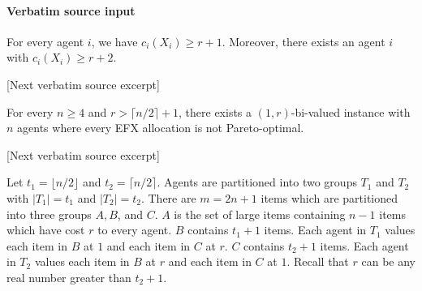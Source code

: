 \documentclass[10pt]{article}
\begin{document}
\paragraph{Verbatim source input}
\begin{ReviewVerbatim}
\begin{proposition}\label{prop:r+1r+2}
    For every agent $i$, we have $c_i(X_i)\geq r+1$. Moreover, there exists an agent $i$ with $c_i(X_i)\geq r+2$.
\end{proposition}

[Next verbatim source excerpt]

\begin{theorem}\label{thm:EFXPO}
    For every $n\geq 4$ and $r>\lceil n/2\rceil+1$, there exists a $(1,r)$-bi-valued instance with $n$ agents where every EFX allocation is not Pareto-optimal.
\end{theorem}

[Next verbatim source excerpt]

Let $t_1=\lfloor n/2\rfloor$ and $t_2=\lceil n/2\rceil$.
Agents are partitioned into two groups $T_1$ and $T_2$ with $|T_1|=t_1$ and $|T_2|=t_2$.
There are $m=2n+1$ items which are partitioned into three groups $A,B$, and $C$.
$A$ is the set of large items containing $n-1$ items which have cost $r$ to every agent.
$B$ contains $t_1+1$ items.
Each agent in $T_1$ values each item in $B$ at $1$ and each item in $C$ at $r$.
$C$ contains $t_2+1$ items.
Each agent in $T_2$ values each item in $B$ at $r$ and each item in $C$ at $1$.
Recall that $r$ can be any real number greater than $t_2+1$.
\end{ReviewVerbatim}
\end{document}
